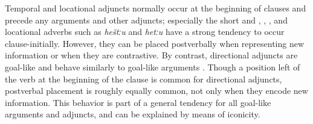 Temporal and locational adjuncts normally occur at the beginning of clauses and precede any arguments and other adjuncts; especially the short   and   , , , and locational adverbs such as \textit{heštːu}  and \textit{hetːu}  have a strong tendency to occur clause-initially. However, they can be placed postverbally when representing new information or when they are contrastive. By contrast, directional adjuncts are goal-like and behave similarly to goal-like arguments . Though a position left of the verb at the beginning of the clause is common for directional adjuncts, postverbal placement is roughly equally common, not only when they encode new information. This behavior is part of a general tendency for all goal-like arguments and adjuncts, and can be explained by means of iconicity.

